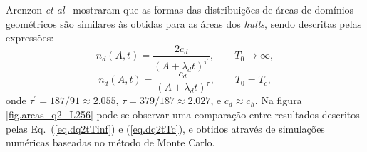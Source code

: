 Arenzon \textit{et al}~\cite{PRLJeferson,PREJeferson} mostraram que as formas das distribuições de áreas de domínios geométricos são similares às obtidas para as áreas dos \textit{hulls}, sendo descritas pelas expressões:
\begin{equation}
 \label{eq.dq2tTinf}
 n_d(A,t) = \frac{2c_d}{\left(A + \lambda_d t \right)^{\tau^\prime}}, \qquad T_0 \rightarrow \infty,
\end{equation}
\begin{equation}
 \label{eq.dq2tTc}
 n_d(A,t) = \frac{c_d}{\left(A + \lambda_d t\right)^\tau}, \qquad T_0 = T_c,
\end{equation}
onde $\tau^\prime = 187/91 \approx 2.055$, $\tau = 379/187 \approx 2.027$, e $c_d \approx c_h$. Na figura \ref{fig.areas_q2_L256} pode-se observar uma comparação entre resultados descritos pelas Eq.~(\ref{eq.dq2tTinf}) e (\ref{eq.dq2tTc}), e obtidos através de simulações numéricas baseadas no método de Monte Carlo.

